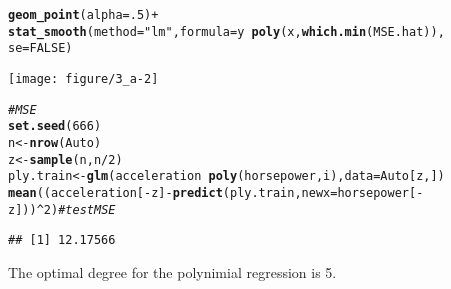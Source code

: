 \documentclass[12pt,fleqn]{article}\usepackage[]{graphicx}\usepackage[]{color}
\makeatletter
\def\maxwidth{ %
  \ifdim\Gin@nat@width>\linewidth
    \linewidth
  \else
    \Gin@nat@width
  \fi
}
\newcommand{\hlnum}[1]{\textcolor[rgb]{0.686,0.059,0.569}{#1}}%
\newcommand{\hlstr}[1]{\textcolor[rgb]{0.192,0.494,0.8}{#1}}%
\newcommand{\hlcom}[1]{\textcolor[rgb]{0.678,0.584,0.686}{\textit{#1}}}%
\newcommand{\hlopt}[1]{\textcolor[rgb]{0,0,0}{#1}}%
\newcommand{\hlstd}[1]{\textcolor[rgb]{0.345,0.345,0.345}{#1}}%
\newcommand{\hlkwb}[1]{\textcolor[rgb]{0.69,0.353,0.396}{#1}}%
\newcommand{\hlkwc}[1]{\textcolor[rgb]{0.333,0.667,0.333}{#1}}%
\newcommand{\hlkwd}[1]{\textcolor[rgb]{0.737,0.353,0.396}{\textbf{#1}}}%
\newenvironment{kframe}{%
 \def\at@end@of@kframe{}%
 \ifinner\ifhmode%
  \def\at@end@of@kframe{\end{minipage}}%
  \begin{minipage}{\columnwidth}%
 \fi\fi%
 \def\FrameCommand##1{\hskip\@totalleftmargin \hskip-\fboxsep
 \colorbox{shadecolor}{##1}\hskip-\fboxsep
     \hskip-\linewidth \hskip-\@totalleftmargin \hskip\columnwidth}%
 \MakeFramed {\advance\hsize-\width
   \@totalleftmargin\z@ \linewidth\hsize
   \@setminipage}}%
 {\par\unskip\endMakeFramed%
 \at@end@of@kframe}
\newenvironment{knitrout}{}{} %
\theoremstyle{definition}
\makeatother
\begin{document}
\begin{enumerate}[1.]
\begin{enumerate}[(a)]
\begin{knitrout}
\begin{kframe}
\begin{alltt}
  \hlkwd{geom_point}\hlstd{(}\hlkwc{alpha} \hlstd{=} \hlnum{.5}\hlstd{)} \hlopt{+}
  \hlkwd{stat_smooth}\hlstd{(}\hlkwc{method} \hlstd{=} \hlstr{"lm"}\hlstd{,} \hlkwc{formula} \hlstd{= y} \hlopt{~} \hlkwd{poly}\hlstd{(x,}\hlkwd{which.min}\hlstd{(MSE.hat)),}
              \hlkwc{se} \hlstd{=} \hlnum{FALSE}\hlstd{)}
\end{alltt}
\end{kframe}
\texttt{[image: figure/3\_a-2]} 
\begin{kframe}\begin{alltt}
\hlcom{# MSE}
\hlkwd{set.seed}\hlstd{(}\hlnum{666}\hlstd{)}
\hlstd{n} \hlkwb{<-} \hlkwd{nrow}\hlstd{(Auto)}
\hlstd{z} \hlkwb{<-} \hlkwd{sample}\hlstd{(n,n}\hlopt{/}\hlnum{2}\hlstd{)}
\hlstd{ply.train} \hlkwb{<-} \hlkwd{glm}\hlstd{( acceleration} \hlopt{~} \hlkwd{poly}\hlstd{(horsepower,i),} \hlkwc{data} \hlstd{= Auto[z,])}
\hlkwd{mean}\hlstd{((acceleration[}\hlopt{-}\hlstd{z]} \hlopt{-} \hlkwd{predict}\hlstd{(ply.train,} \hlkwc{newx}\hlstd{=horsepower[}\hlopt{-}\hlstd{z]))}\hlopt{^}\hlnum{2}\hlstd{)} \hlcom{# test MSE}
\end{alltt}
\begin{verbatim}
## [1] 12.17566
\end{verbatim}
\end{kframe}
\end{knitrout}
          The optimal degree for the polynimial regression is 5.


\end{enumerate}
\end{enumerate}
\end{document}

